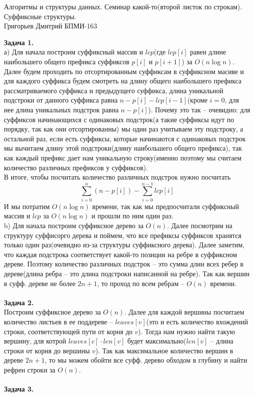 \documentclass[12pt,a4paper]{scrartcl}
\begin{document}
	\begin{center}	
		Алгоритмы и структуры данных. Семинар какой-то(второй листок по строкам).
Суффиксные структуры. \\
		Григорьев Дмитрий БПМИ-163\\
	\end{center}
	\textbf{Задача 1.} \\
	
	а) Для начала построим суффиксный массив и $lcp$(где  $lcp[i]$ равен длине наибольшего общего префикса суффиксов $p[i]$ и $p[i+1]$) за $O(n\log n)$.\\
	Далее будем проходить по отсортированным суффиксам в суффиксном масиве и для каждого суффикса будем смотреть на длину общего наибольшего префикса рассматриваемого суффикса и предыдущего суффикса, длина уникальной подстроки от данного суффикса равна $n - p[i] - lcp[i - 1]$(кроме $i = 0$, для нее длина уникальных подстрок равна $n - p[i]$). Почему это так -- очевидно: для суффиксов начинающихся с одинаковых подстрок(а такие суффиксы идут по порядку, так как они отсортированны) мы один раз учитываем эту подстроку, а остальной раз, если есть суффиксы, которые начинаются с одинаковых подстрок мы вычитаем длину этой подстроки(длину наибольшего общего префикса), так как каждый префикс дает нам уникальную строку(именно поэтому мы считаем количество различных префиксов у суффиксов).\\
	В итоге, чтобы посчитать количество различных подстрок нужно посчитать 
	$$\sum_{i = 0}^n (n - p[i]) - \sum_{i = 0}^{n - 1}lcp[i]$$
	И мы потратим $O(n\log n)$ времени, так как мы предпосчитали суффиксный массив и $lcp$ за $O(n \log n)$ и прошли по ним один раз.\\
	
	b) Для начала построим суффиксное дерево за $O(n)$. Далее посмотрим на структуру суффисорго дерева и поймем, что все префиксы суффиксов хранятся только один раз(очевидно из-за структуры суффиксного дерева). Далее заметим, что каждая подстрока соответствует какой-то позиции на ребре в суффиксном дереве. Поэтому количество различных подстрок -- это сумма длин всех ребер в дереве(длина ребра -- это длина подстроки написанной на ребре). Так как вершин в суфф. дереве не более $2n + 1$, то проход по всем ребрам -- $O(n)$ времени.\\
	\\
	\textbf{Задача 2.} \\
	
	Построим суффиксное дерево за $O(n)$. Далее для каждой вершины посчитаем количество листьев в ее поддереве -- $leaves[v]$(это и есть количество вхождений строки, соответствующей пути от корня до $v$). Тогда нам нужно найти такую вершину, для котрой $leaves[c] \cdot len[v]$ будет максимально($len[v]$ -- длина строки от корня до вершины $v$). Так как максимальное количество вершин в дереве $2n + 1$, то мы можем обойти все суфф. дерево обходом в глубину и найти рефрен строки за $O(n)$.
	\\
	\\
	\textbf{Задача 3.} \\
	
\end{document}
